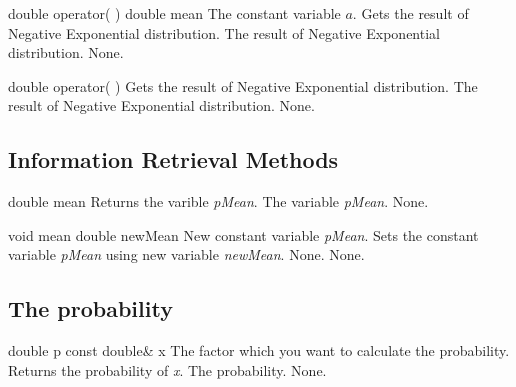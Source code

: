 \setNormalInstance
\printMethodWithOneParam
{double}
{operator( )}
{double}
{mean}
{The constant variable $a$.}
{Gets the result of Negative Exponential distribution.}
{The result of Negative Exponential distribution.}
{None.}

\clearpage

\setNormalInstance
\printEmptyMethodReturnSpecial
{double}
{operator( )}
{Gets the result of Negative Exponential  distribution.}
{The result of Negative Exponential distribution.}
{None.}

\vspace*{10mm}

\subsection{Information Retrieval Methods}

\setConstInstance
\printEmptyMethodReturnSpecial
{double}
{mean}
{Returns the varible {\em pMean}.}
{The variable {\em pMean}.}
{None.}

\setNormalInstance
\printMethodWithOneParam
{void}
{mean}
{double}
{newMean}
{New constant variable {\em pMean}.}
{Sets the constant variable {\em pMean} using new variable {\em newMean}.}
{None.}
{None.}

\vspace*{10mm}

\subsection{The probability}

\setConstInstance
\printMethodWithOneParam
{double}
{p}
{const double\&}
{x}
{The factor which you want to calculate the probability.}
{Returns the probability of {\em x}.}
{The probability.}
{None.}



